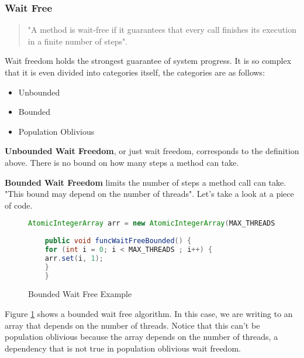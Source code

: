 \documentclass[letterpaper, 12pt]{article}
\begin{document}
\par\vspace{\baselineskip}

\subsubsection{Wait Free}
\begin{quotation}
	"A method is wait-free if it guarantees that every call finishes its execution
	in a finite number of steps"\citep[p. 59]{artofmulti}.
\end{quotation}

Wait freedom holds the strongest guarantee of system progress. It is so complex that it is 
even divided into categories itself, the categories are as follows:

\begin{itemize}
  \item Unbounded
  \item Bounded
  \item Population Oblivious
\end{itemize}
\newpage

{\bfseries Unbounded Wait Freedom}, or just wait freedom, corresponds to the definition above. There is no bound on how many steps a method can take. 

\par\vspace{\baselineskip}

{\bfseries Bounded Wait Freedom} limits the number of steps a method call can take. "This bound 
may depend on the number of threads"\citep[p. 59]{artofmulti}. Let's take a look at a 
piece of code. 

\begin{figure}
	\begin{lstlisting}[language=Java]
	AtomicIntegerArray arr = new AtomicIntegerArray(MAX_THREADS);
	
	public void funcWaitFreeBounded() {
	for (int i = 0; i < MAX_THREADS ; i++) {
	arr.set(i, 1);
	}
	}
	\end{lstlisting}
	\citep{concurrencyfreaks}
	\caption{Bounded Wait Free Example} \label{boundedwaitfree_ex}
\end{figure}
 
Figure \ref{boundedwaitfree_ex} shows a bounded wait free algorithm. 
In this case, we are writing to an array that depends on the number of threads. Notice that this can't be 
population oblivious because the array depends on the number of threads, a dependency that is not 
true in population oblivious wait freedom.
\end{document}
